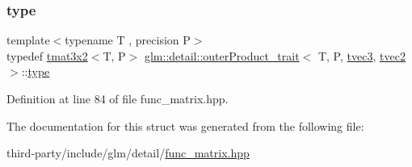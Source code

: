 \subsubsection{\texorpdfstring{type}{type}}
{\footnotesize\ttfamily template$<$typename T , precision P$>$ \\
typedef \hyperlink{structglm_1_1detail_1_1tmat3x2}{tmat3x2}$<$T, P$>$ \hyperlink{structglm_1_1detail_1_1outer_product__trait}{glm\+::detail\+::outer\+Product\+\_\+trait}$<$ T, P, \hyperlink{structglm_1_1detail_1_1tvec3}{tvec3}, \hyperlink{structglm_1_1detail_1_1tvec2}{tvec2} $>$\+::\hyperlink{structglm_1_1detail_1_1outer_product__trait_3_01_t_00_01_p_00_01tvec3_00_01tvec2_01_4_a241608939fa083f2ddb7c701be75a732}{type}}



Definition at line 84 of file func\+\_\+matrix.\+hpp.



The documentation for this struct was generated from the following file\+:\begin{DoxyCompactItemize}
\item 
third-\/party/include/glm/detail/\hyperlink{func__matrix_8hpp}{func\+\_\+matrix.\+hpp}\end{DoxyCompactItemize}

